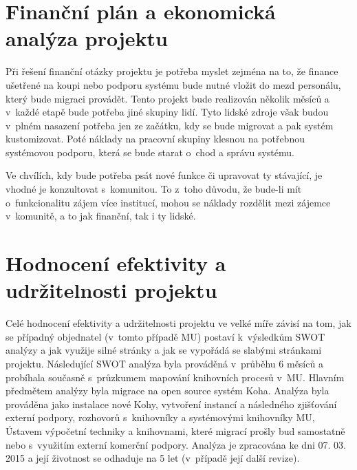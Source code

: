 \documentclass[
	11pt, oneside, printed, draft, 
	table,   %
	lof,     %
	lot     %
]{fithesis3}
\begin{document}
{\section{Finanční plán a ekonomická analýza projektu}
Při řešení finanční otázky projektu je potřeba myslet zejména na to, že finance ušetřené na koupi nebo podporu systému bude nutné vložit do mezd personálu, který bude migraci provádět. Tento projekt bude realizován několik měsíců a v~každé etapě bude potřeba jiné skupiny lidí. Tyto lidské zdroje však budou v~plném nasazení potřeba jen ze začátku, kdy se bude migrovat a pak systém kustomizovat. Poté náklady na pracovní skupiny klesnou na potřebnou systémovou podporu, která se bude starat o~chod a správu systému.

Ve chvílích, kdy bude potřeba psát nové funkce či upravovat ty stávající, je vhodné je konzultovat s~komunitou. To z~toho důvodu, že bude-li mít o~funkcionalitu zájem více institucí, mohou se náklady rozdělit mezi zájemce v~komunitě, a to jak finanční,  tak i ty lidské.

\section{Hodnocení efektivity a udržitelnosti projektu}
Celé hodnocení efektivity a udržitelnosti projektu ve velké míře závisí na tom, jak se případný objednatel (v~tomto případě MU) postaví k~výsledkům SWOT analýzy a jak využije silné stránky a jak se vypořádá se slabými stránkami projektu. Následující SWOT analýza byla prováděná v~průběhu 6 měsíců a probíhala současně s~průzkumem mapování knihovních procesů v~MU. Hlavním předmětem analýzy byla migrace na open source systém Koha. Analýza byla prováděna jako instalace nové Kohy, vytvoření instancí a následného zjišťování externí podpory, rozhovorů s~knihovníky a systémovými knihovníky MU, Ústavem výpočetní techniky a knihovnami, které migrací prošly bud samostatně nebo s~využitím externí komerční podpory. Analýza je zpracována ke dni 07. 03. 2015 a její životnost se odhaduje na 5 let (v~případě její další revize).

}
\end{document}
